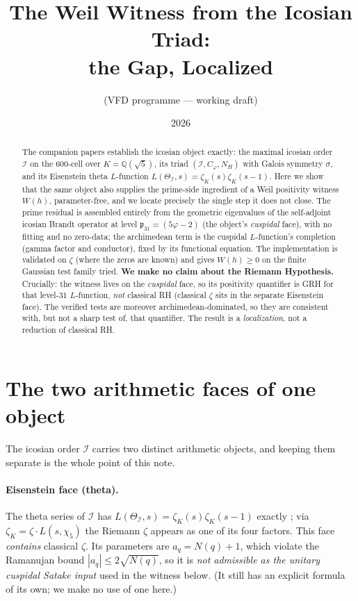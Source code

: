 \documentclass[11pt]{article}
\title{The Weil Witness from the Icosian Triad:\\ the Gap, Localized}
\author{(VFD programme --- working draft)}
\date{2026}
\theoremstyle{definition}
\newcommand{\Q}{\mathbb{Q}}
\newcommand{\zetaK}{\zeta_{K}}
\newcommand{\Icos}{\mathcal{I}}
\begin{document}
\maketitle

\begin{abstract}
The companion papers establish the icosian object exactly: the maximal icosian order
$\Icos$ on the $600$-cell over $K=\Q(\sqrt5)$, its triad $(\Icos, C_\varphi, N_H)$ with
Galois symmetry $\sigma$, and its Eisenstein theta $L$-function
$L(\Theta_\Icos,s)=\zetaK(s)\zetaK(s-1)$. Here we show that the same object also supplies
the prime-side ingredient of a Weil positivity witness $W(h)$, parameter-free, and we
locate precisely the single step it does not close. The prime residual is assembled
entirely from the geometric eigenvalues of the self-adjoint icosian Brandt operator at
level $\mathfrak p_{31}=(5\varphi-2)$ (the object's \emph{cuspidal} face), with no fitting
and no zero-data; the archimedean term is the cuspidal $L$-function's completion (gamma
factor and conductor), fixed by its functional equation. The implementation is validated
on $\zeta$ (where the zeros are known) and gives $W(h)\ge 0$ on the finite Gaussian test
family tried. \textbf{We make no claim about the Riemann Hypothesis.} Crucially: the
witness lives on the \emph{cuspidal} face, so its positivity quantifier is GRH for that
level-$31$ $L$-function, \emph{not} classical RH (classical $\zeta$ sits in the separate
Eisenstein face). The verified tests are moreover archimedean-dominated, so they are
consistent with, but not a sharp test of, that quantifier. The result is a
\emph{localization}, not a reduction of classical RH.
\end{abstract}

\section{The two arithmetic faces of one object}
The icosian order $\Icos$ carries two distinct arithmetic objects, and keeping them
separate is the whole point of this note.

\paragraph{Eisenstein face (theta).} The theta series of $\Icos$ has
$L(\Theta_\Icos,s)=\zetaK(s)\zetaK(s-1)$ exactly \cite{IcosianTriad}; via
$\zetaK=\zeta\cdot L(s,\chi_5)$ the Riemann $\zeta$ appears as one of its four factors.
This face \emph{contains} classical $\zeta$. Its parameters are $a_q=N(q)+1$, which
violate the Ramanujan bound $|a_q|\le 2\sqrt{N(q)}$, so it is \emph{not admissible as the
unitary cuspidal Satake input} used in the witness below. (It still has an explicit
formula of its own; we make no use of one here.)
\end{document}
